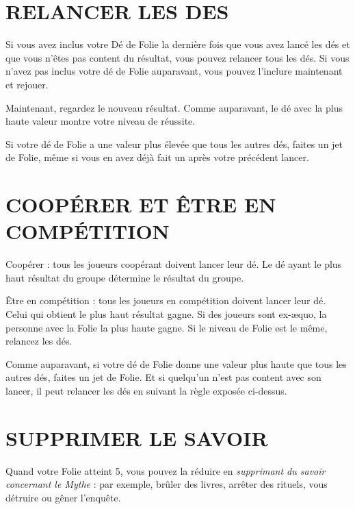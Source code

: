 
\section{RELANCER LES DES}

Si vous avez inclus votre Dé de Folie la dernière fois que vous avez lancé les dés et que vous n'êtes pas content du résultat, vous pouvez relancer tous les dés. Si vous n'avez pas inclus votre dé de Folie auparavant, vous pouvez l'inclure maintenant et rejouer.

Maintenant, regardez le nouveau résultat. Comme auparavant, le dé avec la plus haute valeur montre votre niveau de réussite.

Si votre dé de Folie a une valeur plus élevée que tous les autres dés, faites un jet de Folie, même si vous en avez déjà fait un après votre précédent lancer.

\section{COOPÉRER ET ÊTRE EN COMPÉTITION}

Coopérer : tous les joueurs coopérant doivent lancer leur dé. Le dé ayant le plus haut résultat du groupe détermine le résultat du groupe.

Être en compétition : tous les joueurs en compétition doivent lancer leur dé. Celui qui obtient le plus haut résultat gagne. Si des joueurs sont ex-æquo, la personne avec la Folie la plus haute gagne. Si le niveau de Folie est le même, relancez les dés.

Comme auparavant, si votre dé de Folie donne une valeur plus haute que tous les autres dés, faites un jet de Folie. Et si quelqu'un n'est pas content avec son lancer, il peut relancer les dés en suivant la règle exposée ci-dessus.

\section{SUPPRIMER LE SAVOIR}

Quand votre Folie atteint 5, vous pouvez la réduire en \textit{supprimant du savoir concernant le Mythe} : par exemple, brûler des livres, arrêter des rituels, vous détruire ou gêner l'enquête.

